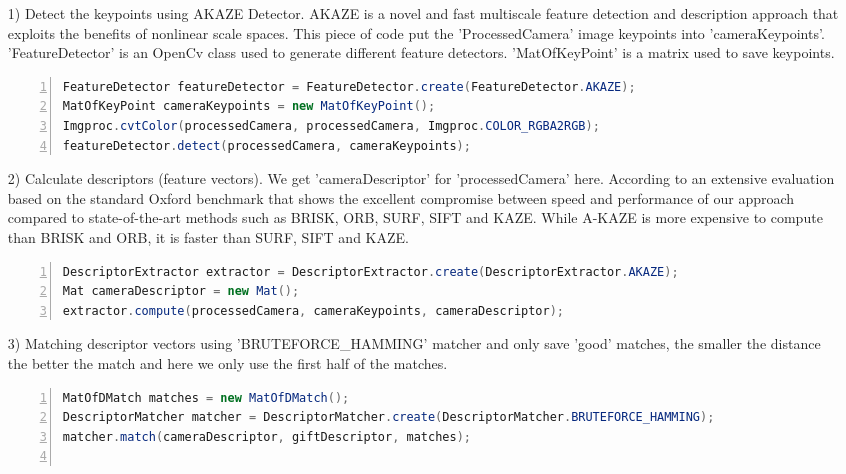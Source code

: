 \begin{enumerate}
\item[1)] Detect the keypoints using {\ttfamily AKAZE} Detector. {\ttfamily AKAZE} is a novel and fast multiscale feature detection and description approach that exploits the benefits of nonlinear scale spaces.\cite{alcantarilla2011fast} This piece of code put the {\ttfamily 'ProcessedCamera'} image keypoints into {\ttfamily 'cameraKeypoints'}. {\ttfamily 'FeatureDetector'} is an OpenCv class used to generate different feature detectors. {\ttfamily 'MatOfKeyPoint'} is a matrix used to save keypoints.

\begin{lstlisting}[language={java},
        numbers=left,basicstyle=\footnotesize\ttfamily,breaklines=true,xleftmargin=.05\textwidth, xrightmargin=.05\textwidth]
FeatureDetector featureDetector = FeatureDetector.create(FeatureDetector.AKAZE);
MatOfKeyPoint cameraKeypoints = new MatOfKeyPoint();
Imgproc.cvtColor(processedCamera, processedCamera, Imgproc.COLOR_RGBA2RGB);
featureDetector.detect(processedCamera, cameraKeypoints);
\end{lstlisting} 

\item[2)] Calculate descriptors (feature vectors). We get {\ttfamily 'cameraDescriptor'} for {\ttfamily 'processedCamera'} here. According to an extensive evaluation based on the standard Oxford benchmark \cite{mikolajczyk2005} that shows the excellent compromise between speed and performance of our approach compared to state-of-the-art methods such as BRISK, ORB, SURF, SIFT and KAZE. While A-KAZE is more expensive to compute than BRISK and ORB, it is faster than SURF, SIFT and KAZE.\cite{alcantarilla2011fast}
\begin{lstlisting}[language={java},
        numbers=left,basicstyle=\footnotesize\ttfamily,breaklines=true,xleftmargin=.05\textwidth, xrightmargin=.05\textwidth]
DescriptorExtractor extractor = DescriptorExtractor.create(DescriptorExtractor.AKAZE);
Mat cameraDescriptor = new Mat();
extractor.compute(processedCamera, cameraKeypoints, cameraDescriptor);
\end{lstlisting} 
\item[3)] Matching descriptor vectors using {\ttfamily 'BRUTEFORCE\_HAMMING'} matcher and only save 'good' matches, the smaller the distance the better the match and here we only use the first half of the matches. 
\begin{lstlisting}[language={java},
        numbers=left,basicstyle=\footnotesize\ttfamily,breaklines=true,xleftmargin=.05\textwidth, xrightmargin=.05\textwidth]
MatOfDMatch matches = new MatOfDMatch();
DescriptorMatcher matcher = DescriptorMatcher.create(DescriptorMatcher.BRUTEFORCE_HAMMING);
matcher.match(cameraDescriptor, giftDescriptor, matches);
            

\end{lstlisting}
\end{enumerate}

